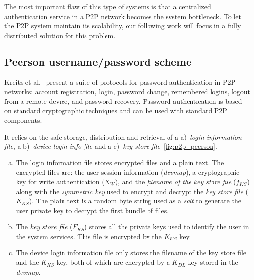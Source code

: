 The most important flaw of this type of systems is that a centralized authentication service in a P2P network becomes the system
bottleneck. To let the P2P system maintain its scalability, our following work will focus in a
fully distributed solution for this problem.

\subsection{Peerson username/password scheme}

Kreitz et al.~\cite{kreitz2012passwords} present a suite of protocols for password
authentication in P2P networks: account registration, login, password change,
remembered logins, logout from a remote device, and password recovery.
Password authentication is based on standard cryptographic techniques and can
be used with standard P2P components. 

It relies on the safe storage, distribution and retrieval of a a)~\textit{login information
file}, a b)~\textit{device login info file} and a c)~\textit{key store
file}~\ref{fig:p2p_peerson}.

\begin{enumerate}[a)]

  \item The login information file stores encrypted files and a
plain text. The encrypted files are: the user session information (\textit{devmap}), a
cryptographic key for write authentication ($K_W$), and the \textit{filename of the
key store file} ($f_{KS}$) along with the \textit{symmetric key} used to encrypt and
decrypt the \textit{key store file} ($K_{KS}$). The plain text is a random byte string used as a \textit{salt} to generate the user private key to
decrypt the first bundle of files. 

  \item The \textit{key store file} ($F_{KS}$) stores all the private keys used to identify the
    user in the system services. This file is encrypted by the $K_{KS}$ key.

  \item The device login information file only stores the filename of the key
    store file and the $K_{KS}$ key, both of which are encrypted by a $K_{DL}$ key
    stored in the \textit{devmap}.
\end{enumerate}

